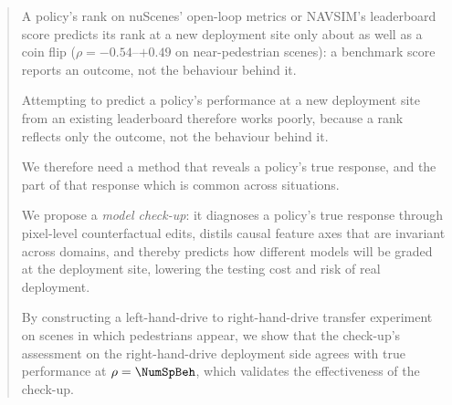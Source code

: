 \begin{abstract}
A policy's rank on nuScenes' open-loop metrics or NAVSIM's leaderboard score predicts its rank at a
new deployment site only about as well as a coin flip ($\rho=-0.54$--$+0.49$ on near-pedestrian
scenes): a benchmark score reports an outcome, not the behaviour behind it.

Attempting to predict a policy's performance at a new deployment site from an existing leaderboard
therefore works poorly, because a rank reflects only the outcome, not the behaviour behind it.

We therefore need a method that reveals a policy's true response, and the part of that response which
is common across situations.

We propose a \emph{model check-up}: it diagnoses a policy's true response
through pixel-level counterfactual edits, distils causal feature axes that are invariant across
domains, and thereby predicts how different models will be graded at the deployment site, lowering
the testing cost and risk of real deployment. 

By constructing a left-hand-drive to right-hand-drive
transfer experiment on scenes in which pedestrians appear, we show that the check-up's assessment on
the right-hand-drive deployment side agrees with true performance at $\rho={\NumSpBeh}$, which
validates the effectiveness of the check-up.

\end{abstract}

